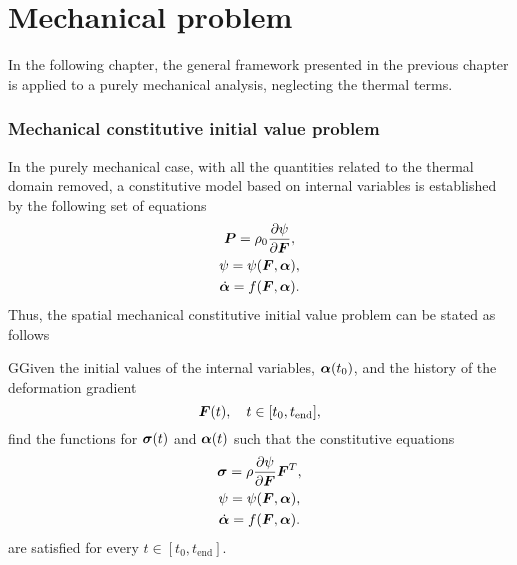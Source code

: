 \chapter{Mechanical problem}

In the following chapter, the general framework presented in the previous chapter is applied to a purely mechanical analysis, neglecting the thermal terms.

\subsection{Mechanical constitutive initial value problem}

In the purely mechanical case, with all the quantities related to the thermal domain removed, a constitutive model based on internal variables is established by the following set of equations
    \begin{gather}
        \bm{P} = \rho_0 \frac{\partial \psi}{\partial \bm{F}},\\
        \psi = \psi(\bm{F},\bm{\alpha}),\\
        \dot{\bm{\alpha}} = f(\bm{F}, \bm{\alpha}).
    \end{gather}
  Thus, the spatial mechanical constitutive initial value problem can be stated as follows
  \begin{problem}
  GGiven the initial values of the internal variables, $\bm{\alpha}(t_0)$, and the history of the deformation gradient
  \begin{equation}
      \bm{F}(t),\quad t\in[t_0,t_\text{end}],
  \end{equation}
  find the functions for $\bm{\sigma}(t)$ and $\bm{\alpha}(t)$ such that the constitutive equations
  \begin{gather}
      \bm{\sigma} = \rho \frac{\partial \psi}{\partial \bm{F}} \bm{F}^T,\\
      \psi = \psi(\bm{F}, \bm{\alpha}),\\
      \dot{\bm{\alpha}} = f(\bm{F}, \bm{\alpha}).
  \end{gather}
  are satisfied for every $t\in [t_0, t_\text{end}]$.
  \end{problem}

